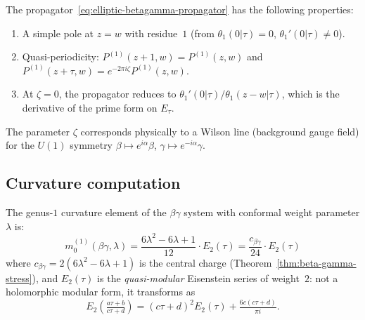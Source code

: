 \begin{remark}
The propagator~\eqref{eq:elliptic-betagamma-propagator} has the
following properties:
\begin{enumerate}
\item A simple pole at $z = w$ with residue~$1$
 (from $\theta_1(0|\tau) = 0$, $\theta_1'(0|\tau) \neq 0$).
\item Quasi-periodicity: $P^{(1)}(z+1,w) = P^{(1)}(z,w)$ and
 $P^{(1)}(z+\tau,w) = e^{-2\pi i \zeta} P^{(1)}(z,w)$.
\item At $\zeta = 0$, the propagator reduces to
 $\theta_1'(0|\tau)/\theta_1(z-w|\tau)$, which is the derivative of
 the prime form on $E_\tau$.
\end{enumerate}
The parameter $\zeta$ corresponds physically to a
Wilson line (background gauge field) for the $U(1)$ symmetry
$\beta \mapsto e^{i\alpha}\beta$,
$\gamma \mapsto e^{-i\alpha}\gamma$.
\end{remark}

\subsection{Curvature computation}

\begin{proposition}
\label{prop:betagamma-genus1-curvature}
The genus-$1$ curvature element of the $\beta\gamma$ system with
conformal weight parameter $\lambda$ is:
\begin{equation}\label{eq:betagamma-genus1-curvature}
m_0^{(1)}(\beta\gamma, \lambda)
= \frac{6\lambda^2 - 6\lambda + 1}{12} \cdot E_2(\tau)
= \frac{c_{\beta\gamma}}{24} \cdot E_2(\tau)
\end{equation}
where $c_{\beta\gamma} = 2(6\lambda^2 - 6\lambda + 1)$ is the
central charge (Theorem~\ref{thm:beta-gamma-stress}), and
$E_2(\tau)$ is the \emph{quasi-modular} Eisenstein series of
weight~$2$: not a holomorphic modular form, it transforms as
\[
E_2\!\left(\tfrac{a\tau+b}{c\tau+d}\right)
= (c\tau+d)^2 E_2(\tau) + \tfrac{6c(c\tau+d)}{\pi i}.
\]
\end{proposition}

